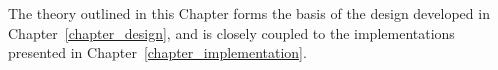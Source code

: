 
The theory outlined in this Chapter forms the basis of the design developed in
Chapter~\ref{chapter_design}, and is closely coupled to the implementations
presented in Chapter~\ref{chapter_implementation}.

